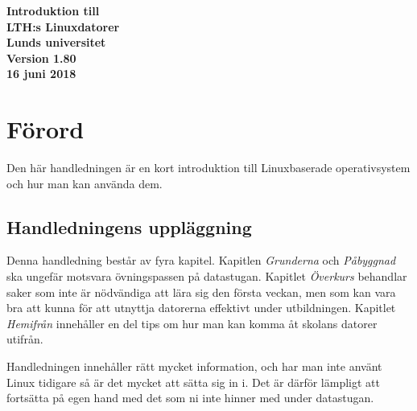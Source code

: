 \documentclass[a4paper,twocolumn]{book}
\begin{document}
\frontmatter

\begin{titlepage}
  \vspace*{30mm}
  \begin{center}
    \sffamily
    \renewcommand{\baselinestretch}{1.1}
    \Huge\bfseries Introduktion till \\[2mm]
      LTH:s Linuxdatorer \\[7mm]
    \large Lunds universitet \\[5mm]
    Version 1.80 \\
    16 juni 2018
  \end{center}
\end{titlepage}

\onecolumn
\thispagestyle{empty}
\hbox{}\vfill\noindent
\twocolumn

{\parskip 0pt%
  \tableofcontents}             %

\chapter{Förord}
\label{cha:forord}

Den här handledningen är en kort introduktion till Linuxbaserade operativsystem och 
hur man kan använda dem.

\section*{Handledningens uppläggning}

Denna handledning består av fyra kapitel. Kapitlen \emph{Grunderna} och \emph{Påbyggnad} ska ungefär
motsvara övningspassen på datastugan. Kapitlet \emph{Överkurs}
behandlar saker som inte är nödvändiga att lära sig den första veckan,
men som kan vara bra att kunna för att utnyttja datorerna effektivt under
utbildningen. Kapitlet \emph{Hemifrån} innehåller en del tips om hur man kan
komma åt skolans datorer utifrån.

Handledningen innehåller rätt mycket information, och har man inte använt Linux
 tidigare så är det mycket att sätta sig in i.
Det är därför lämpligt att fortsätta på egen hand med det som ni
inte hinner med under datastugan.
\end{document}
